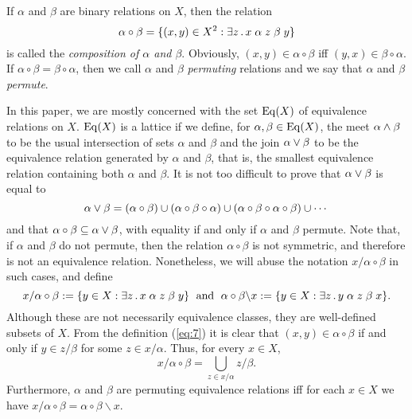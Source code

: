 
If $\alpha$ and $\beta$ are binary relations on $X$, then the relation
\begin{equation}
  \label{eq:7}
\alpha \circ \beta = \{(x,y) \in X^2: \exists z\,.\, x \mathrel{\alpha} z \mathrel{\beta} y\}
\end{equation}
is called the \emph{composition of $\alpha$ and $\beta$}. 
Obviously, $(x,y) \in \alpha\circ \beta$ iff $(y,x) \in \beta\circ \alpha$.
If $\alpha \circ \beta = \beta \circ \alpha$, then we call $\alpha$ and $\beta$ 
\emph{permuting} relations and we say that $\alpha$ and $\beta$ \emph{permute}. 

In this paper, we are mostly concerned with the set 
$\operatorname{Eq}(X)$ of equivalence relations on $X$. 
$\operatorname{Eq}(X)$ is a lattice if we define, 
for $\alpha, \beta \in \operatorname{Eq}(X)$, the meet $\alpha\wedge \beta$
to be the usual intersection of sets $\alpha$ and $\beta$ and the join 
$\alpha \vee \beta$ to be the equivalence relation generated by
$\alpha$ and $\beta$, that is, the smallest equivalence relation containing both 
$\alpha$ and $\beta$.  It is not too difficult to prove that 
$\alpha \vee \beta$ is equal to 
\[
\alpha \vee \beta = (\alpha\circ \beta) \cup 
(\alpha\circ \beta \circ \alpha) \cup
(\alpha\circ \beta \circ \alpha \circ \beta) \cup \cdots
\]
and that 
$\alpha \circ \beta \subseteq \alpha \vee \beta$,
with equality if and only if $\alpha$ and $\beta$ permute.
Note that, if $\alpha$ and $\beta$ do not permute, then 
the relation $\alpha\circ \beta$ is not symmetric, and therefore 
is not an equivalence relation.
Nonetheless, we will abuse the notation
$x/\alpha\circ \beta$ in such cases, and define
\begin{equation*}
x/\alpha\circ \beta:= \{y\in X : \exists z\,.\, x \mathrel{\alpha} z \mathrel{\beta} y\}
\;\text{ and }\;
\alpha\circ \beta\backslash x:= \{y\in X : \exists z\,.\, y \mathrel{\alpha} z \mathrel{\beta} x\}.
\end{equation*}
Although these are not necessarily
equivalence classes, they are well-defined subsets of $X$. 
From the definition (\ref{eq:7}) it is clear that %
$(x,y) \in \alpha\circ \beta$ if and only if
$y \in z/\beta$ for some $z\in x/\alpha$.  Thus, for every $x\in X$,
  \begin{equation}
    \label{eq:1}
x/\alpha\circ \beta = \bigcup_{z \in x/\alpha} z/\beta.
  \end{equation}
 Furthermore,
$\alpha$ and $\beta$ are permuting equivalence relations 
iff for each $x\in X$ we have $x/\alpha\circ \beta = \alpha\circ \beta\backslash x$.

